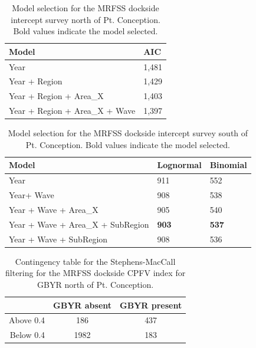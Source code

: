 \documentclass[12pt,]{article}
\begin{document}
\vspace{3cm}

\begin{table}[ht]
\centering
\caption{Model selection for the MRFSS dockside intercept survey 
                                        north of Pt. Conception. Bold 
                                        values indicate the model selected.} 
\label{tab:Fleet10_AIC}
\begin{tabular}{ll}
  \hline
Model & AIC \\ 
  \hline
Year & 1,481 \\ 
  Year + Region & 1,429 \\ 
  Year + Region + Area\_X & 1,403 \\ 
  Year + Region + Area\_X + Wave & 1,397 \\ 
   \hline
\end{tabular}
\end{table}

\vspace{3cm}

\begin{table}[ht]
\centering
\caption{Model selection for the MRFSS dockside intercept 
                                        survey south of Pt. Conception. Bold 
                                        values indicate the model selected.} 
\label{tab:Fleet11_AIC}
\begin{tabular}{lll}
  \hline
Model & Lognormal & Binomial \\ 
  \hline
Year & 911 & 552 \\ 
  Year+ Wave & 908 & 538 \\ 
  Year + Wave + Area\_X & 905 & 540 \\ 
  Year + Wave + Area\_X + SubRegion & \textbf{903} & \textbf{537} \\ 
  Year + Wave + SubRegion & 908 & 536 \\ 
   \hline
\end{tabular}
\end{table}

\begin{table}[ht]
\centering
\caption{Contingency table for the Stephens-MacCall 
                                            filtering for the MRFSS dockside CPFV index 
                                            for GBYR north of Pt. Conception.} 
\label{tab:Fleet10_contingency}
\begin{tabular}{rcc}
  \hline
  & GBYR absent & GBYR present \\ 
  \hline
Above 0.4 & 186 & 437 \\ 
  Below 0.4 & 1982 & 183 \\ 
   \hline
\end{tabular}
\end{table}
\end{document}
